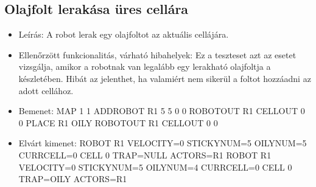 \subsection{Olajfolt lerakása üres cellára}
\begin{itemize}
	\item Leírás: \newline
A robot lerak egy olajfoltot az aktuális cellájára.
	\item Ellenőrzött funkcionalitás, várható hibahelyek: \newline
Ez a teszteset azt az esetet vizsgálja, amikor a robotnak van legalább egy lerakható olajfoltja a készletében. Hibát az jelenthet, ha valamiért nem sikerül a foltot hozzáadni az adott cellához.
	\item Bemenet: \newline
MAP 1 1 \newline
ADDROBOT R1 5 5 0 0	 \newline
ROBOTOUT R1 \newline
CELLOUT 0 0 \newline
PLACE R1 OILY \newline
ROBOTOUT R1 \newline
CELLOUT 0 0
	\item Elvárt kimenet: \newline
ROBOT R1 VELOCITY=0 STICKYNUM=5 OILYNUM=5 CURRCELL=0 \newline
CELL 0 TRAP=NULL ACTORS=R1 \newline
ROBOT R1 VELOCITY=0 STICKYNUM=5 OILYNUM=4 CURRCELL=0 \newline
CELL 0 TRAP=OILY ACTORS=R1

\end{itemize}

